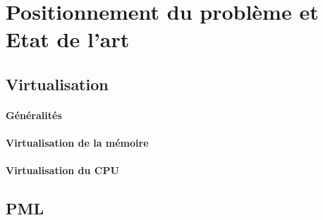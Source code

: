\let\textcircled=\pgftextcircled
\chapter{Positionnement du problème et Etat de l'art}
\label{chap:etat_de_lart}

\minitoc

\newpage    
\section{Virtualisation}

\subsubsection{Généralités}

\subsubsection{Virtualisation de la mémoire}

\subsubsection{Virtualisation du CPU}

\section{PML}